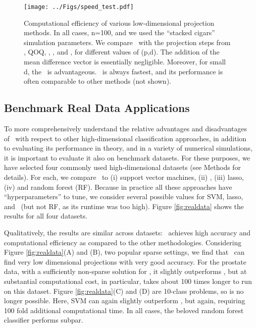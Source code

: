 \documentclass[10pt]{article}
\begin{document}
\begin{figure}[h!]
\centering
\texttt{[image: ../Figs/speed\_test.pdf]}
\caption{
Computational efficiency of various low-dimensional projection methods. In all cases, n=100, and we used the ``stacked cigars'' simulation parameters.   We compare \Pca~with the projection steps from \Lol, QOQ, \Lrl, \Lfl, and \Lal, for different values of (p,d).  The addition of the mean difference vector is essentially negligible.  Moreover, for small d, the \Lfl~is advantageous.  \Lal~is always fastest, and its performance is often comparable to other methods (not shown).
}
\label{fig:speed}
\end{figure}




\subsection*{Benchmark Real Data Applications}


To more comprehensively understand the relative advantages and disadvantages of \Lol~with respect to other high-dimensional classification approaches, in addition to evaluating its performance in theory, and in a variety of numerical simulations, 
 it is important to evaluate it also on benchmark datasets.  For these purposes, we have selected four commonly used high-dimensional datasets (see Methods for details).  For each, we compare \Lol~to (i) support vector machines, (ii) , (iii) lasso, (iv) and random forest (RF).  Because in practice all these approaches have ``hyperparameters'' to tune, we consider several possible values for  SVM, lasso, and \Lol~(but not RF, as its runtime was too high).  Figure \ref{fig:realdata} shows the results for all four datasets.  

 Qualitatively, the results are similar across datasets: \Lol~achieves high accuracy and computational efficiency as compared to the other methodologies.  Considering Figure \ref{fig:realdata}(A) and (B), two popular sparse settings, we find that \Lol~can find very low dimensional projections with very good accuracy. For the prostate data, with a sufficiently non-sparse solution for , it slightly outperforms \Lol, but at substantial computational cost, in particular,  takes about 100 times longer to run on this dataset.   Figure \ref{fig:realdata}(C) and (D) are 10-class problems, so  is no longer possible.  Here, SVM can again slightly outperform \Lol, but again, requiring 100 fold additional computational time.  In all cases, the beloved random forest classifier performs subpar.
\end{document}
